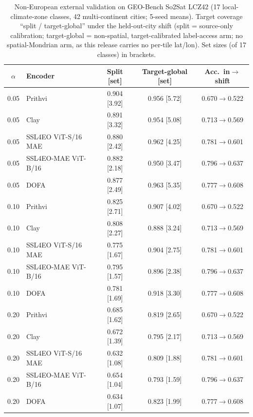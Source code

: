 \documentclass[journal]{IEEEtran}
\renewcommand{\_}{\textunderscore\allowbreak}
\begin{document}
\begin{table}[htbp]\centering\small
\caption{Non-European external validation on GEO-Bench So2Sat LCZ42 (17 local-climate-zone classes,
42 multi-continent cities; 5-seed means). Target coverage ``split / target-global'' under the held-out-city
shift (split = source-only calibration; target-global = non-spatial, target-calibrated label-access arm; no
spatial-Mondrian arm, as this release carries no per-tile lat/lon). Set sizes (of 17 classes) in
brackets.}\label{tab:so2sat}
\begin{tabular}{clccc}
\toprule
$\alpha$ & Encoder & Split [set] & Target-global [set] & Acc.\ in$\to$shift \\
\midrule
0.05 & Prithvi & 0.904 [3.92] & 0.956 [5.72] & 0.670$\to$0.522 \\
0.05 & Clay & 0.891 [3.32] & 0.954 [5.08] & 0.713$\to$0.569 \\
0.05 & SSL4EO ViT-S/16 MAE & 0.880 [2.42] & 0.962 [4.25] & 0.781$\to$0.601 \\
0.05 & SSL4EO-MAE ViT-B/16 & 0.882 [2.18] & 0.950 [3.47] & 0.796$\to$0.637 \\
0.05 & DOFA & 0.877 [2.49] & 0.963 [5.35] & 0.777$\to$0.608 \\
\midrule
0.10 & Prithvi & 0.825 [2.71] & 0.907 [4.02] & 0.670$\to$0.522 \\
0.10 & Clay & 0.808 [2.27] & 0.888 [3.24] & 0.713$\to$0.569 \\
0.10 & SSL4EO ViT-S/16 MAE & 0.775 [1.67] & 0.904 [2.75] & 0.781$\to$0.601 \\
0.10 & SSL4EO-MAE ViT-B/16 & 0.795 [1.57] & 0.896 [2.38] & 0.796$\to$0.637 \\
0.10 & DOFA & 0.781 [1.69] & 0.918 [3.30] & 0.777$\to$0.608 \\
\midrule
0.20 & Prithvi & 0.685 [1.62] & 0.819 [2.65] & 0.670$\to$0.522 \\
0.20 & Clay & 0.672 [1.39] & 0.795 [2.17] & 0.713$\to$0.569 \\
0.20 & SSL4EO ViT-S/16 MAE & 0.632 [1.08] & 0.809 [1.88] & 0.781$\to$0.601 \\
0.20 & SSL4EO-MAE ViT-B/16 & 0.654 [1.04] & 0.793 [1.59] & 0.796$\to$0.637 \\
0.20 & DOFA & 0.634 [1.07] & 0.823 [1.99] & 0.777$\to$0.608 \\
\bottomrule
\end{tabular}
\end{table}
\end{document}

